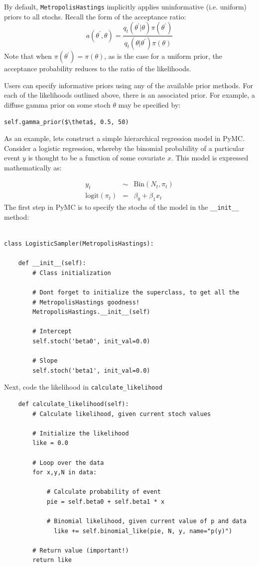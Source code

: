 \documentclass[]{book}
\begin{document}
By default, \verb=MetropolisHastings= implicitly applies uninformative (i.e. uniform) priors to all stochs. Recall the form of the acceptance ratio:
\[
a(\theta^{\prime},\theta) = \frac{q_t(\theta^{\prime} | \theta) \pi(\theta^{\prime})}{q_t(\theta | \theta^{\prime}) \pi(\theta)}
\]
Note that when $\pi(\theta^{\prime}) = \pi(\theta)$, as is the case for a uniform prior, the acceptance probability reduces to the ratio of the likelihoods.

Users can specify informative priors using any of the available prior methods. For each of the likelihoods outlined above, there is an associated prior. For example, a diffuse gamma prior on some stoch $\theta$ may be specified by:
\begin{verbatim}
self.gamma_prior($\theta$, 0.5, 50)
\end{verbatim}

As an example, lets construct a simple hierarchical regression model in PyMC. Consider a logistic regression, whereby the binomial probability of a particular event $y$ is thought to be a function of some covariate $x$. This model is expressed mathematically as:

\begin{eqnarray*}
    y_t &\sim& \mbox{Bin}(N_t, \pi_t) \\
    \mbox{logit}(\pi_t) &=& \beta_0 + \beta_1 x_t
\end{eqnarray*}
The first step in PyMC is to specify the stochs of the model in the \verb=__init__= method:
\begin{verbatim}

class LogisticSampler(MetropolisHastings):

    def __init__(self):
        # Class initialization

        # Dont forget to initialize the superclass, to get all the
        # MetropolisHastings goodness!
        MetropolisHastings.__init__(self)

        # Intercept
        self.stoch('beta0', init_val=0.0)

        # Slope
        self.stoch('beta1', init_val=0.0)
\end{verbatim}
Next, code the likelihood in \verb=calculate_likelihood=
\begin{verbatim}
    def calculate_likelihood(self):
        # Calculate likelihood, given current stoch values

        # Initialize the likelihood
        like = 0.0

        # Loop over the data
        for x,y,N in data:

            # Calculate probability of event
            pie = self.beta0 + self.beta1 * x

            # Binomial likelihood, given current value of p and data
              like += self.binomial_like(pie, N, y, name="p(y)")

        # Return value (important!)
        return like
\end{verbatim}
\end{document}
